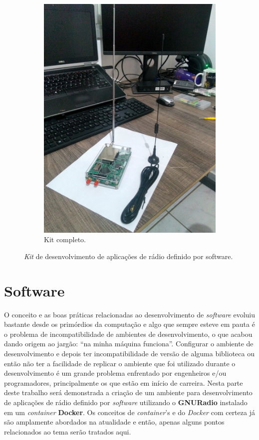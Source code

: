 \documentclass[
  12pt,				%
  openright,			%
  twoside,			%
  a4paper,			%
  english,			%
  french,				%
  spanish,			%
  brazil,				%
  ]{abntex2}
\begin{document}
\begin{figure}[!htb]
\begin{subfigure}[b]{0.45\linewidth}
    \includegraphics[width=\linewidth]{figures/hackrf/hack_rf_kit.jpg}
    \caption{Kit completo.}
    \label{fig:hack_rf_kit}
  \end{subfigure}
  \caption{\textit{Kit} de desenvolvimento de aplicações de rádio definido por software.}
  \label{fig:hack_rf_hdk}
\end{figure}

\chapter{Software}

O conceito e as boas práticas relacionadas ao desenvolvimento de \textit{software} evoluiu bastante desde os primórdios da computação e algo que sempre esteve
em pauta é o problema de incompatibilidade de ambientes de desenvolvimento, o que acabou dando origem ao jargão: “na minha máquina funciona”.
Configurar o ambiente de desenvolvimento e depois ter incompatibilidade de versão de alguma biblioteca ou então não ter a facilidade de replicar o ambiente
que foi utilizado durante o desenvolvimento é um grande problema enfrentado por engenheiros e/ou programadores, principalmente os que estão em início de carreira.
Nesta parte deste trabalho será demonstrada a criação de um ambiente para desenvolvimento de aplicações de rádio definido por \textit{software} utilizando
o \textbf{GNURadio} instalado em um \textit{container} \textbf{Docker}.
Os conceitos de \textit{container}'s e do \textit{Docker} com certeza já são amplamente abordados na atualidade e então, apenas alguns pontos relacionados ao tema
serão tratados aqui.
\end{document}
